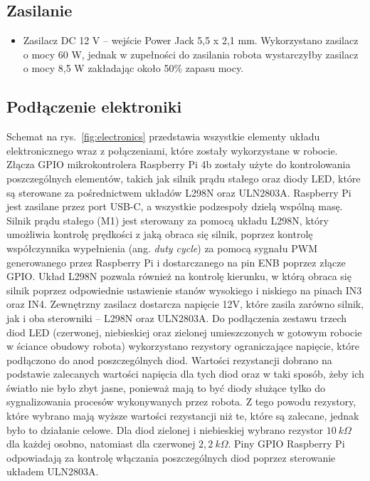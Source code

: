 \subsection{Zasilanie}
\begin{itemize}
    \item Zasilacz DC 12 V -- wejście Power Jack 5,5 x 2,1 mm. Wykorzystano zasilacz o mocy 60 W, jednak w zupełności do zasilania robota wystarczyłby zasilacz o mocy 8,5 W zakładając około 50\% zapasu mocy.
\end{itemize}

\subsection{Podłączenie elektroniki}

Schemat na rys.~\ref{fig:electronics} przedstawia wszystkie elementy układu elektronicznego wraz z połączeniami, które zostały wykorzystane w robocie.
Złącza GPIO mikrokontrolera Raspberry Pi 4b zostały użyte do kontrolowania poszczególnych elementów, takich jak silnik prądu stałego oraz diody LED, które są sterowane za 
pośrednictwem układów L298N oraz ULN2803A. Raspberry Pi jest zasilane przez port USB-C, a wszystkie podzespoły dzielą wspólną masę.
Silnik prądu stałego (M1) jest sterowany za pomocą układu L298N, który umożliwia kontrolę prędkości z jaką obraca się silnik, poprzez kontrolę współczynnika wypełnienia (ang. \textit{duty cycle})
za pomocą sygnału PWM generowanego przez Raspberry Pi i dostarczanego na pin ENB poprzez złącze GPIO. Układ L298N pozwala również na kontrolę kierunku, w którą obraca się silnik poprzez
odpowiednie ustawienie stanów wysokiego i niskiego na pinach IN3 oraz IN4.
Zewnętrzny zasilacz dostarcza napięcie 12V, które zasila zarówno silnik, jak i oba sterowniki -- L298N oraz ULN2803A.
Do podłączenia zestawu trzech diod LED (czerwonej, niebieskiej oraz zielonej umieszczonych w gotowym robocie w ściance obudowy robota) wykorzystano rezystory ograniczające napięcie, które podłączono 
do anod poszczególnych diod. Wartości rezystancji dobrano na podstawie zalecanych wartości napięcia dla tych diod oraz w taki sposób, żeby ich światło nie było zbyt jasne, ponieważ 
mają to być diody służące tylko do sygnalizowania procesów wykonywanych przez robota. Z tego powodu rezystory, które wybrano mają wyższe wartości rezystancji niż te, które są zalecane, jednak było to
działanie celowe. Dla diod zielonej i niebieskiej wybrano rezystor $10~k\Omega$ dla każdej osobno, natomiast dla czerwonej $2{,}2~k\Omega$. Piny GPIO Raspberry Pi odpowiadają za kontrolę włączania poszczególnych diod poprzez sterowanie układem ULN2803A.
